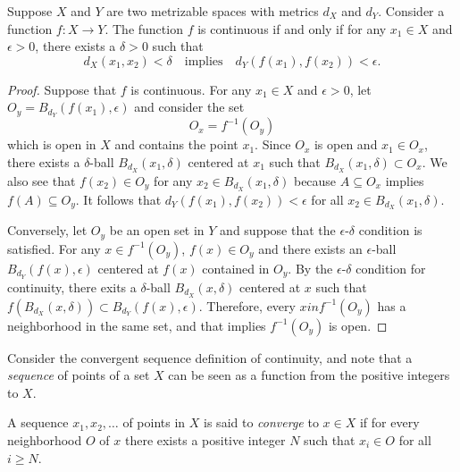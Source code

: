 \begin{theorem}
Suppose $X$ and $Y$ are two metrizable spaces with metrics $d_X$ and $d_Y$.
Consider a function $f : X \rightarrow Y$.
The function $f$ is continuous if and only if for any $x_1 \in X$ and $\epsilon > 0$, there exists a $\delta > 0$ such that
\begin{equation*}
d_X(x_1, x_2) < \delta
\quad \text{implies} \quad
d_Y \left( f(x_1), f(x_2) \right) < \epsilon.
\end{equation*}
\end{theorem}
\begin{proof}
Suppose that $f$ is continuous.
For any $x_1 \in X$ and $\epsilon > 0$, let $O_y =  B_{d_Y} (f(x_1), \epsilon)$ and consider the set
\begin{equation*}
O_x = f^{-1} \left( O_y \right)
\end{equation*}
which is open in $X$ and contains the point $x_1$.
Since $O_x$ is open and $x_1 \in O_x$, there exists a $\delta$-ball $B_{d_X} (x_1, \delta)$ centered at $x_1$ such that $B_{d_X} (x_1, \delta) \subset O_x$.
We also see that $f(x_2) \in O_y$ for any $x_2 \in B_{d_X} (x_1, \delta)$ because $A \subseteq O_x$ implies $f(A) \subseteq O_y$.
It follows that $d_Y \left( f(x_1), f(x_2) \right) < \epsilon$ for all $x_2 \in B_{d_X} (x_1, \delta)$.

Conversely, let $O_y$ be an open set in $Y$ and suppose that the $\epsilon$-$\delta$ condition is satisfied.
For any $x \in f^{-1} (O_y)$, $f(x) \in O_y$ and there exists an $\epsilon$-ball $B_{d_Y} (f(x), \epsilon)$ centered at $f(x)$ contained in $O_y$.
By the $\epsilon$-$\delta$ condition for continuity, there exits a $\delta$-ball $B_{d_X} (x, \delta)$ centered at $x$ such that $f \left( B_{d_X} (x,\delta) \right) \subset B_{d_Y} \left( f(x), \epsilon \right)$.
Therefore, every $x in f^{-1}(O_y)$ has a neighborhood in the same set, and that implies $f^{-1} (O_y)$ is open.
\end{proof}

Consider the convergent sequence definition of continuity, and note that a \emph{sequence} of points of a set $X$ can be seen as a function from the positive integers to $X$.

\begin{definition} \label{definition:SequenceConvergence}
A sequence $x_1, x_2, \ldots$ of points in $X$ is said to \emph{converge} to $x \in X$ if for every neighborhood $O$ of $x$ there exists a positive integer $N$ such that $x_i \in O$ for all $i \geq N$.
\end{definition}


